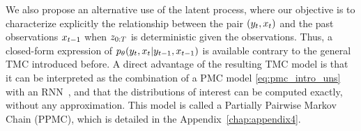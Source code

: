  

% 

\begin{remark}
  We also propose an alternative use of the latent process, where our
  objective is to characterize explicitly the relationship
  between the pair $(y_t,x_t)$ and the past observations $x_{t-1}$ when
  $z_{0:T}$ is deterministic given the observations. Thus,  a closed-form
  expression of $p_{\theta}(y_t,x_t|y_{t-1},x_{t-1})$ is available contrary to
  the general TMC introduced before.
  A direct advantage of the resulting TMC model is that
  it can be interpreted as the combination of a PMC model \eqref{eq:pmc_intro_uns}
  with an RNN~\citep{rumelhart1986learning,
  mikolov2014learning}, and that the distributions of interest can be computed
  exactly, without any approximation.
  This model is called a Partially Pairwise Markov Chain (PPMC), which is 
  detailed in the Appendix~\ref{chap:appendix4}.
\end{remark}


